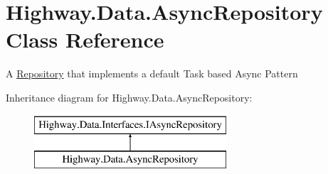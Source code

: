 \hypertarget{class_highway_1_1_data_1_1_async_repository}{\section{Highway.\-Data.\-Async\-Repository Class Reference}
\label{class_highway_1_1_data_1_1_async_repository}
}


A \hyperlink{class_highway_1_1_data_1_1_repository}{Repository} that implements a default Task based Async Pattern  


Inheritance diagram for Highway.\-Data.\-Async\-Repository\-:\begin{figure}[H]
\begin{center}
\leavevmode
\includegraphics[height=2.000000cm]{class_highway_1_1_data_1_1_async_repository}
\end{center}
\end{figure}
